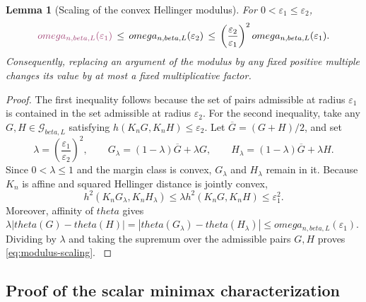 \documentclass[11pt]{article}
\def\beta{beta}%
\def\theta{theta}%
\def\omega{omega}%
\newtheorem{lemma}[theorem]{Lemma}
\newcommand{\calG}{\mathcal G}
\newcommand{\eps}{\varepsilon}
\newcommand\aed[1]{{\color{magenta!60!black} #1}}
\begin{document}
\begin{lemma}[Scaling of the convex Hellinger modulus]
\label{lem:modulus-scaling}
For $0<\eps_1\le\eps_2$,
\begin{equation}
\label{eq:modulus-scaling}
\aed{\omega_{n,\beta,L}(\eps_1)} \,\le\, \omega_{n,\beta,L}(\eps_2)
\,\le\,
\left(\frac{\eps_2}{\eps_1}\right)^2
\omega_{n,\beta,L}(\eps_1).
\end{equation}
Consequently, replacing an argument of the modulus by any fixed positive multiple changes its value by at most a fixed multiplicative factor.
\end{lemma}

\begin{proof}
\aed{The first inequality follows because the set of pairs admissible at radius $\eps_1$ is contained in the set admissible at radius $\eps_2$.  For the second inequality, take any $G,H\in\calG_{\beta,L}$ satisfying $h(K_nG,K_nH)\le\eps_2$. Let $\overline G=(G+H)/2$, and set
\[
\lambda=\left(\frac{\eps_1}{\eps_2}\right)^2,
\qquad
G_\lambda=(1-\lambda)\overline G+\lambda G,
\qquad
H_\lambda=(1-\lambda)\overline G+\lambda H.
\]
Since $0<\lambda\le1$ and the margin class is convex, $G_\lambda$ and $H_\lambda$ remain in it.  Because $K_n$ is affine and squared Hellinger distance is jointly convex,
\[
h^2(K_nG_\lambda,K_nH_\lambda)
\le
\lambda h^2(K_nG,K_nH)
\le\eps_1^2.
\]
Moreover, affinity of $\theta$ gives
$
\lambda|\theta(G)-\theta(H)|
=
|\theta(G_\lambda)-\theta(H_\lambda)|
\le
\omega_{n,\beta,L}(\eps_1).
$
Dividing by $\lambda$ and taking the supremum over the admissible pairs $G,H$ proves \eqref{eq:modulus-scaling}.
}
\end{proof}

\subsection{Proof of the scalar minimax characterization}
\end{document}

